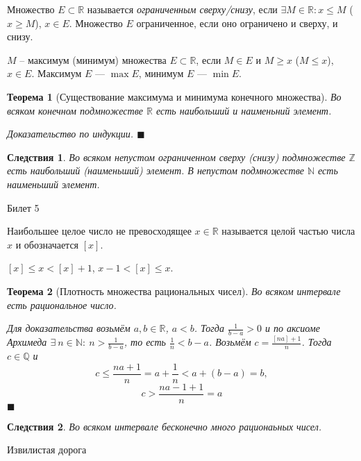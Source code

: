 \documentclass[12pt,a4paper]{article}
\newtheorem*{theorem*}{Теорема}
\newtheorem*{conseq*}{Следствия}
\begin{document}
Множество $E \subset \mathbb{R}$ называется \textit{ограниченным сверху/снизу}, если $\exists M \in \mathbb{R}: x \leq M$ ($x \geq M$), $x \in E$. Множество $E$ ограниченное, если оно ограничено и сверху, и снизу.

$M$ -- максимум (минимум) множества $E \subset \mathbb{R}$, если $M \in E$ и $M \geq x$ ($M \leq x$), $x \in E$. Максимум $E$ --- $\max E$, минимум $E$ --- $\min E$.

\begin{theorem*}[Существование максимума и минимума конечного множества]
\label{4.1}
Во всяком конечном подмножестве $\mathbb{R}$ есть наибольший и наименьний элемент.

Доказательство по индукции. $\blacksquare$
\end{theorem*}

\begin{conseq*}
\label{4.2}
Во всяком непустом ограниченном сверху (снизу) подмножестве $\mathbb{Z}$ есть наибольший (наименьший) элемент.
\newline
В непустом подмножестве $\mathbb{N}$ есть наименьший элемент.
\end{conseq*}

\begin{center}
Билет 5
\end{center}

Наибольшее целое число не превосходящее $x \in \mathbb{R}$ называется целой частью числа $x$ и обозначается $[x]$.

$[x] \leq x < [x] + 1$, $x - 1 < [x] \leq x$.

\begin{theorem*}[Плотность множества рациональных чисел]
\label{5.1}
Во всяком интервале есть рациональное число.

Для доказательства возьмём $a, b \in \mathbb{R}$, $a < b$. Тогда $\frac{1}{b-a} > 0$ и по аксиоме Архимеда $\exists\  n \in \mathbb{N}:\ n > \frac{1}{b-a}$, то есть $\frac{1}{n} < b-a$. Возьмём $c=\frac{[na]+1}{n}$. Тогда $c \in \mathbb{Q}$ и
\newline 
$$
c \leq \frac{na+1}{n}=a+\frac{1}{n}<a+(b-a)=b,
$$
$$
c > \frac{na-1+1}{n}=a
$$ $\blacksquare$
\end{theorem*}

\begin{conseq*}
\label{5.2}
Во всяком интервале бесконечно много рационаьных чисел.
\end{conseq*}

\begin{center}
Извилистая дорога
\end{center}
\end{document}
